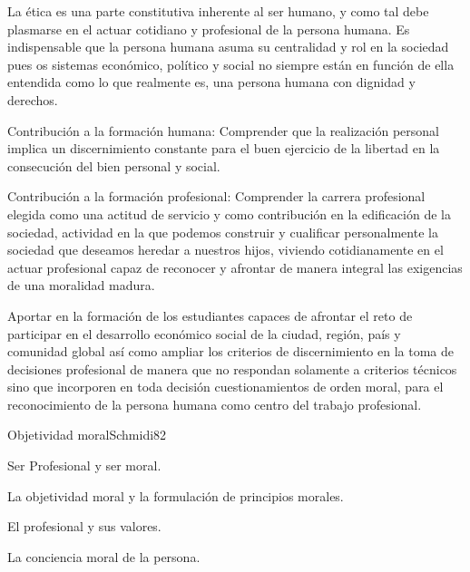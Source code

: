 \begin{syllabus}


\begin{justification}
La ética es una parte constitutiva inherente al ser humano, y  como tal debe plasmarse en el 
actuar cotidiano y profesional de la persona humana. Es indispensable que la persona humana 
asuma su centralidad y rol en la sociedad pues os sistemas económico, político y social no 
siempre están en función de ella entendida como lo que realmente es, una persona humana con 
dignidad y derechos.

Contribución a la formación humana: Comprender que la realización personal implica  un 
discernimiento constante para el buen ejercicio de la libertad en la consecución del bien 
personal y social.

Contribución a la formación profesional: Comprender la carrera profesional elegida como 
una actitud de servicio y como contribución en la edificación de la sociedad, actividad 
en la que podemos construir  y cualificar personalmente la sociedad que deseamos heredar 
a nuestros hijos, viviendo cotidianamente en el actuar profesional capaz de reconocer y 
afrontar de manera integral las exigencias de una moralidad madura.

\end{justification}

\begin{goals}
\item Aportar en la formación de los estudiantes capaces de afrontar el reto de participar 
en el desarrollo económico social de la ciudad, región, país y comunidad global así 
como ampliar los criterios de discernimiento en la toma de decisiones profesional de 
manera que no respondan solamente a criterios técnicos sino que incorporen en toda 
decisión cuestionamientos de orden moral, para el reconocimiento de la persona 
humana como centro del trabajo profesional.
\end{goals}

\begin{outcomes}
\end{outcomes}

\begin{unit}{Objetividad moral}{Schmidi}{8}{2}
\begin{topics}
      \item Ser Profesional y ser moral.
      \item La objetividad moral y la formulación de principios morales.
      \item El profesional y sus valores.
      \item La conciencia moral de la persona.
\end{topics}


\end{unit}
\end{syllabus}

